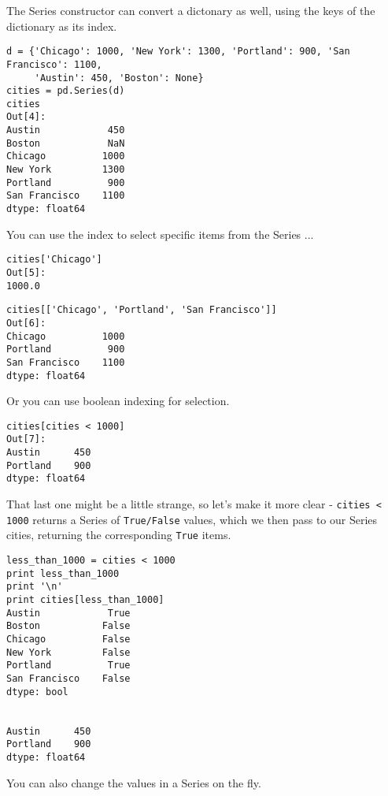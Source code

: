 \begin{itemize}
\begin{frame}
The Series constructor can convert a dictonary as well, using the keys of the dictionary as its index.

\begin{framed}
\begin{verbatim}
d = {'Chicago': 1000, 'New York': 1300, 'Portland': 900, 'San Francisco': 1100,
     'Austin': 450, 'Boston': None}
cities = pd.Series(d)
cities
Out[4]:
Austin            450
Boston            NaN
Chicago          1000
New York         1300
Portland          900
San Francisco    1100
dtype: float64
\end{verbatim}
\end{framed}
You can use the index to select specific items from the Series ...

\begin{framed}
\begin{verbatim}
cities['Chicago']
Out[5]:
1000.0
\end{verbatim}
\end{framed}

\begin{framed}
\begin{verbatim}
cities[['Chicago', 'Portland', 'San Francisco']]
Out[6]:
Chicago          1000
Portland          900
San Francisco    1100
dtype: float64
\end{verbatim}
\end{framed}
Or you can use boolean indexing for selection.

\begin{framed}
\begin{verbatim}
cities[cities < 1000]
Out[7]:
Austin      450
Portland    900
dtype: float64
\end{verbatim}
\end{framed}
That last one might be a little strange, so let's make it more clear - \texttt{cities < 1000} returns a Series of \texttt{True/False} values, which we then pass to our Series cities, returning the corresponding \texttt{True} items.

\begin{framed}
\begin{verbatim}
less_than_1000 = cities < 1000
print less_than_1000
print '\n'
print cities[less_than_1000]
Austin            True
Boston           False
Chicago          False
New York         False
Portland          True
San Francisco    False
dtype: bool


Austin      450
Portland    900
dtype: float64

\end{verbatim}
\end{framed}
You can also change the values in a Series on the fly.


\end{frame}
\end{itemize}
